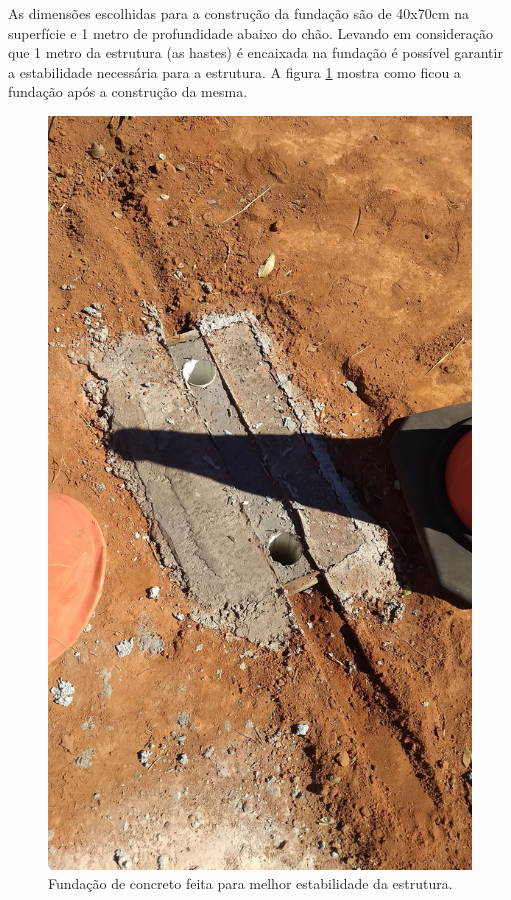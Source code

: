 As dimensões escolhidas para a construção da fundação são de 40x70cm na superfície e 1 metro de profundidade abaixo do chão. Levando em consideração que 1 metro da estrutura (as hastes) é encaixada na fundação é possível garantir a estabilidade necessária para a estrutura. A figura \ref{fund} mostra como ficou a fundação após a construção da mesma.

\begin{figure}[H]
	\centering
    \includegraphics[keepaspectratio=true, angle=90, scale=0.11]{figuras/fund.jpg}
    \caption{Fundação de concreto feita para melhor estabilidade da estrutura.}
    \label{fund}
\end{figure}

